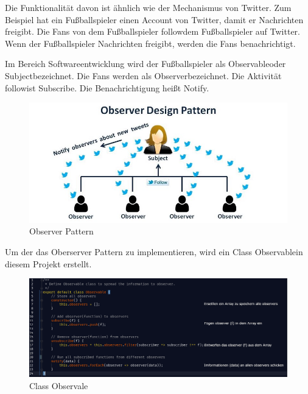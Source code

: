   Die Funktionalität davon ist ähnlich wie der Mechanismus von Twitter. Zum Beispiel hat ein Fußballspieler einen Account von Twitter, damit er Nachrichten freigibt. Die Fans von dem Fußballspieler \glqq follow\grqq dem Fußballspieler auf Twitter. Wenn der Fußballspieler Nachrichten freigibt, werden die Fans benachrichtigt.
  
  Im Bereich Softwareentwicklung wird der Fußballspieler als \glqq Observable\grqq oder \glqq Subject\grqq bezeichnet. Die Fans werden als \glqq Observer\grqq bezeichnet. Die Aktivität \glqq follow\grqq ist \glqq Subscribe\grqq. Die Benachrichtigung heißt \glqq Notify\grqq.
  
\begin{figure}[ht]
\centering
\includegraphics[width=\textwidth]{images/observerPattern.jpeg}
\caption[Observer Pattern]{Observer Pattern}
\label{fig:observerPatern} 
\end{figure}
  
  Um der das Oberserver Pattern zu implementieren, wird ein Class \glqq Observable\grqq in diesem Projekt erstellt.
  
\begin{figure}[ht]
\vspace*{0.3cm}
\centering
\includegraphics[width=\textwidth]{images/observable.png}
\caption[Class Observable]{Class Observale}
\label{fig:observable} 
\end{figure}
  
